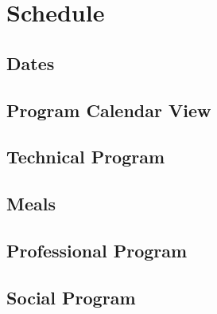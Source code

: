 \section{Schedule}


\subsection{Dates}


\subsection{Program Calendar View}

\subsection{Technical Program}


\subsection{Meals} 


\subsection{Professional Program}


\subsection{Social Program}


